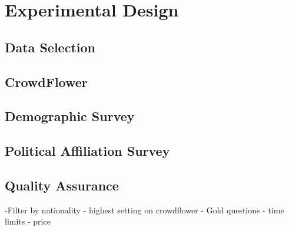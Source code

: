 \chapter{Experimental Design}
\section {Data Selection}
\section{CrowdFlower}
\section{Demographic Survey}
\section{Political Affiliation Survey}
\section{Quality Assurance}
-Filter by nationality
- highest setting on crowdflower
- Gold questions
- time limits
- price